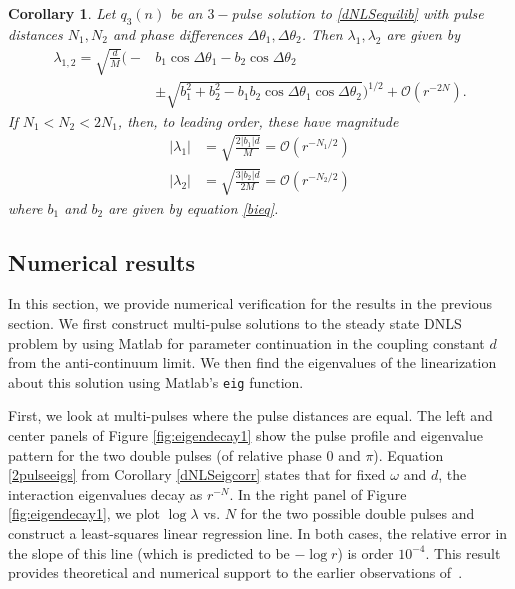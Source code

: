 \documentclass[12pt]{article}
\newtheorem{corollary}{Corollary}
\begin{document}
\begin{corollary}\label{dNLSeigcorr2}
Let $q_3(n)$ be an $3-$pulse solution to \eqref{dNLSequilib} with pulse distances $N_1, N_2$ and phase differences $\Delta \theta_1, \Delta \theta_2$. Then $\lambda_1, \lambda_2$ are given by
\begin{equation}\label{3pulseeigs}
\begin{aligned}
\lambda_{1,2} = \sqrt{\frac{d}{M}}
\Big( -&b_1\cos\Delta\theta_1 - b_2\cos\Delta\theta_2  \\
&\pm \sqrt{b_1^2 + b_2^2 - b_1 b_2\cos\Delta\theta_1 \cos\Delta\theta_2} \Big)^{1/2} + \mathcal{O}(r^{-2N}).
\end{aligned}
\end{equation}
If $N_1 < N_2 < 2 N_1$, then, to leading order, these have magnitude
\begin{equation}\label{3pulsemag}
\begin{aligned}
|\lambda_1| &= \sqrt{\frac{2 |b_1| d}{M}} = \mathcal{O}(r^{-N_1/2}) \\
|\lambda_2| &= \sqrt{\frac{3 |b_2| d}{2 M}} = \mathcal{O}(r^{-N_2/2})
\end{aligned}
\end{equation}
where $b_1$ and $b_2$ are given by equation \eqref{bieq}.
\end{corollary}

\subsection{Numerical results}

In this section, we provide numerical verification for the results in the previous section. We first construct multi-pulse solutions to the steady state DNLS problem by using Matlab for parameter continuation in the coupling constant $d$ from the anti-continuum limit. We then find the eigenvalues of the linearization about this solution using Matlab's \texttt{eig} function. 

First, we look at multi-pulses where the pulse distances are equal.  The left and center panels of Figure \ref{fig:eigendecay1} show the pulse profile and eigenvalue pattern for the two double pulses (of relative
phase $0$ and $\pi$). Equation \eqref{2pulseeigs} from Corollary \ref{dNLSeigcorr} states that for fixed $\omega$ and $d$, the interaction eigenvalues decay as $r^{-N}$. In the right panel of Figure \ref{fig:eigendecay1}, we plot $\log \lambda$ vs. $N$ for the two possible double pulses and construct a least-squares linear regression line. In both cases, the relative error in the slope of this line (which is predicted to be $-\log r$) is order $10^{-4}$. This result provides theoretical and numerical support to the earlier observations of~\cite{Kapitula2001a}.
\end{document}
